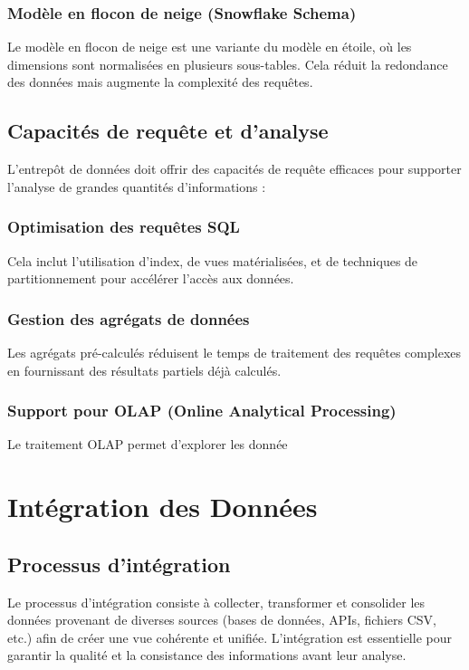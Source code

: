 \documentclass[a4paper,12pt]{report}
\begin{document}
\subsection{Modèle en flocon de neige (Snowflake Schema)}
Le modèle en flocon de neige est une variante du modèle en étoile, où les dimensions sont normalisées en plusieurs sous-tables. Cela réduit la redondance des données mais augmente la complexité des requêtes.

\section{Capacités de requête et d'analyse}
L'entrepôt de données doit offrir des capacités de requête efficaces pour supporter l'analyse de grandes quantités d'informations :
\subsection{Optimisation des requêtes SQL}
Cela inclut l'utilisation d'index, de vues matérialisées, et de techniques de partitionnement pour accélérer l'accès aux données.
\subsection{Gestion des agrégats de données}
Les agrégats pré-calculés réduisent le temps de traitement des requêtes complexes en fournissant des résultats partiels déjà calculés.
\subsection{Support pour OLAP (Online Analytical Processing)}
Le traitement OLAP permet d'explorer les donnée












\chapter{Intégration des Données}

\section{Processus d'intégration}
Le processus d'intégration consiste à collecter, transformer et consolider les données provenant de diverses sources (bases de données, APIs, fichiers CSV, etc.) afin de créer une vue cohérente et unifiée. L'intégration est essentielle pour garantir la qualité et la consistance des informations avant leur analyse.
\end{document}
